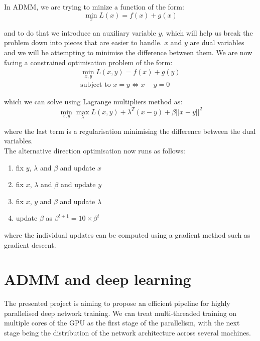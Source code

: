 \documentclass[a4paper, 12pt]{article}
\numberwithin{equation}{section}
\begin{document}
	In ADMM, we are trying to minize a function of the form:
	\begin{equation}
	\min_{x} L(x) = f(x) + g(x)
	\end{equation}
	
	and to do that we introduce an auxiliary variable $y$, which will help us break the problem down into pieces that are easier to handle. $x$ and $y$ are dual variables and we will be attempting to minimise the difference between them. We are now facing a constrained optimisation problem of the form:
	\begin{align}
	\min_{x,y} L(x,y) = f(x) + g(y) \\
	\textrm{subject to } x = y \Leftrightarrow x-y=0
	\end{align}
	
	which we can solve using Lagrange multipliers method as:
	\begin{equation}
	\label{ADMM_equation}
	\min_{x,y} \max_{\lambda} L(x,y) + \lambda^T (x-y) + \beta ||x-y||^2
	\end{equation}
	
	where the last term is a regularisation minimising the difference between the dual variables. \\
	
	The alternative direction optimisation now runs as follows:
	\begin{enumerate}
		\item fix $y$, $\lambda$ and $\beta$ and update $x$
		\item fix $x$, $\lambda$ and $\beta$ and update $y$
		\item fix $x$, $y$ and $\beta$ and update $\lambda$
		\item update $\beta$ as $\beta^{t+1}=10 \times \beta^{t}$
	\end{enumerate} 
	
	where the individual updates can be computed using a gradient method such as gradient descent.
	
	\section{ADMM and deep learning}
	
	The presented project is aiming to propose an efficient pipeline for highly parallelised deep network training. We can treat multi-threaded training on multiple cores of the GPU as the first stage of the parallelism, with the next stage being the distribution of the network architecture across several machines.
	
\end{document}
